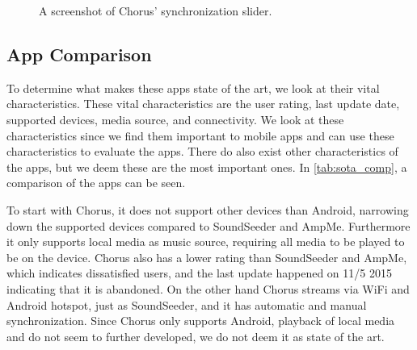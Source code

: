 \begin{figure}[h!]
\begin{minipage}[b]{0.45\textwidth}
        \caption{A screenshot of Chorus' synchronization slider.}\label{fig:chorus_slider}
    \end{minipage}
\end{figure}

\subsection{App Comparison}\label{ssec:app_comparison}
To determine what makes these apps state of the art,
we look at their vital characteristics.
These vital characteristics are the user rating, last update date, supported devices, media source, and connectivity.
We look at these characteristics since we find them important to mobile apps and can use these characteristics to evaluate the apps.
There do also exist other characteristics of the apps, but we deem these are the most important ones. 
In \cref{tab:sota_comp}, a comparison of the apps can be seen. 

To start with Chorus, it does not support other devices than Android, narrowing down the supported devices compared to SoundSeeder and AmpMe.
Furthermore it only supports local media as music source, requiring all media to be played to be on the device. 
Chorus also has a lower rating than SoundSeeder and AmpMe, which indicates dissatisfied users,
and the last update happened on 11/5 2015 indicating that it is abandoned. 
On the other hand Chorus streams via WiFi and Android hotspot, just as SoundSeeder, and it has automatic and manual synchronization.
Since Chorus only supports Android, playback of local media and do not seem to further developed,
we do not deem it as state of the art.

